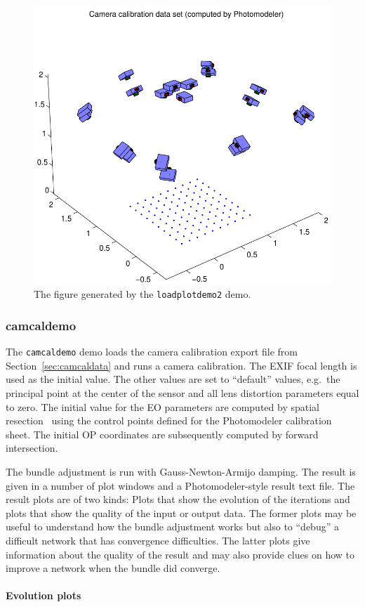 \documentclass{article}
\begin{document}
\begin{figure}
  \centering
  \includegraphics[width=0.5\hsize]{ill/ccam}
  \caption{The figure generated by the \texttt{loadplotdemo2} demo.}
  \label{fig:camcalib}
\end{figure}

\subsubsection{camcaldemo}

The \verb+camcaldemo+ demo loads the camera calibration export file
from Section~\ref{sec:camcaldata} and runs a camera calibration. The
EXIF focal length is used as the initial value. The other values are
set to ``default'' values, e.g.\ the principal point at the center of
the sensor and all lens distortion parameters equal to zero. The
initial value for the EO parameters are computed by spatial
resection~\citep[Chap.~11.1.3.4]{Haralick1994:Review,McGlone2004:Manual} using
the control points defined for the Photomodeler calibration sheet. The
initial OP coordinates are subsequently computed by forward
intersection.

The bundle adjustment is run with Gauss-Newton-Armijo damping. The
result is given in a number of plot windows and a Photomodeler-style
result text file. The result plots are of two kinds: Plots that show
the evolution of the iterations and plots that show the quality of the
input or output data. The former plots may be useful to understand how
the bundle adjustment works but also to ``debug'' a difficult network
that has convergence difficulties. The latter plots give information
about the quality of the result and may also provide clues on how to
improve a network when the bundle did converge.

\paragraph{Evolution plots}
\end{document}
